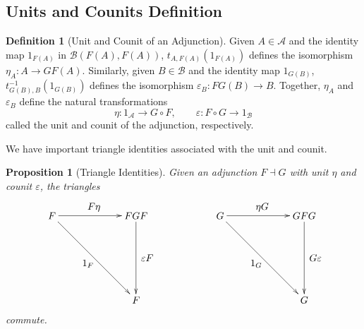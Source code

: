 \documentclass[11pt]{article}
\theoremstyle{definition}
\newtheorem*{defn}{Definition}
\theoremstyle{definition}
\theoremstyle{plain}
\theoremstyle{plain}
\newtheorem{prop}{Proposition}
\theoremstyle{plain}
\begin{document}
 \subsection*{Units and Counits Definition}
 
 \begin{defn}[Unit and Counit of an Adjunction]
 Given $A \in \mathscr{A}$ and the identity map $1_{F(A)}$ in $\mathscr{B}(F(A),F(A))$, $t_{A,F(A)}(1_{F(A)})$ defines the isomorphism $\eta_{A}: A \to GF(A)$. Similarly, given $B \in \mathscr{B}$ and the identity map $1_{G(B)}$, $t^{-1}_{G(B),B}(1_{G(B)})$ defines the isomorphism $\varepsilon_{B}: FG(B) \to B$. Together, $\eta_{A}$ and $\varepsilon_{B}$ define the natural transformations
 \begin{equation*}
 \eta: 1_{\mathscr{A}} \to G \circ F, \qquad \varepsilon: F \circ G \to 1_{\mathscr{B}}
 \end{equation*}
 called the unit and counit of the adjunction, respectively.
 \end{defn}
 
We have important triangle identities associated with the unit and counit.

\begin{prop}[Triangle Identities]
Given an adjunction $F \dashv G$ with unit $\eta$ and counit $\varepsilon$, the triangles

\begin{equation*}
\begin{xy}
(0,0)*+{F}="f1"; (30,0)*+{FGF}="fgf"; (30,-30)*+{F}="f2";
(60,0)*+{G}="g1"; (90,0)*+{GFG}="gfg"; (90, -30)*+{G}="g2";
{\ar "f1";"fgf"}?*!/_3mm/{F\eta}; {\ar "fgf";"f2"}?*!/_4mm/{\varepsilon F}; {\ar "f1";"f2"}?*!/^3mm/{1_{F}};
{\ar "g1";"gfg"}?*!/_3mm/{\eta G}; {\ar "gfg";"g2"}?*!/_4mm/{G \varepsilon}; {\ar "g1";"g2"}?*!/^3mm/{1_{G}};
\end{xy}
\end{equation*}
commute.
\end{prop}
\end{document}
